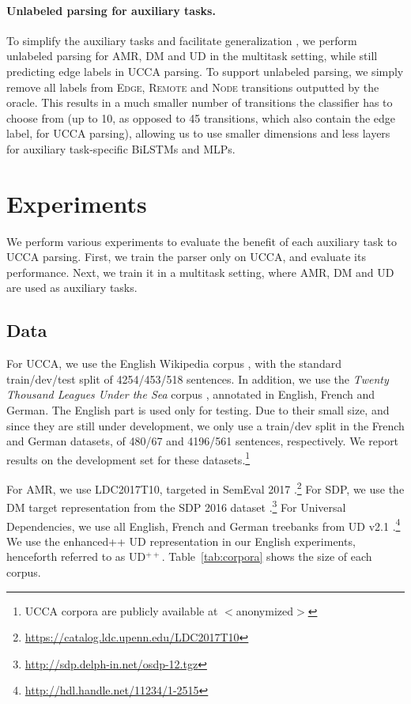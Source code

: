 \documentclass[11pt,a4paper]{article}
\begin{document}
\paragraph{Unlabeled parsing for auxiliary tasks.}

To simplify the auxiliary tasks and facilitate generalization \cite{E17-2026},
we perform unlabeled parsing for AMR, DM and UD in the multitask setting,
while still predicting edge labels in UCCA parsing.
To support unlabeled parsing, we simply remove all labels from
\textsc{Edge}, \textsc{Remote} and \textsc{Node} transitions outputted by the oracle.
This results in a much smaller number of transitions the classifier has to choose from
(up to 10, as opposed to 45 transitions, which also contain the edge label, for UCCA parsing),
allowing us to use smaller dimensions and less layers for auxiliary task-specific BiLSTMs and MLPs.



\section{Experiments}\label{sec:experiments}

We perform various experiments to evaluate the benefit of each auxiliary task to UCCA parsing.
First, we train the parser only on UCCA, and evaluate its performance.
Next, we train it in a multitask setting, where AMR, DM and UD are used as
auxiliary tasks.

\subsection{Data}\label{sec:data}

For UCCA, we use the English Wikipedia corpus \cite{abend2013universal},
with the standard train/dev/test split of 4254/453/518 sentences.
In addition, we use
the \textit{Twenty Thousand Leagues Under the Sea} corpus \cite[20K leagues;][]{sulem2015conceptual},
annotated in English, French and German.
The English part is used only for testing.
Due to their small size, and since they are still under development, we only use a train/dev split
in the French and German datasets, of 480/67 and 4196/561 sentences, respectively.
We report results on the development set for these datasets.\footnote{UCCA corpora are publicly
available at $<$anonymized$>$}

For AMR, we use LDC2017T10, targeted in SemEval 2017
\cite{may2017semeval}.\footnote{\url{https://catalog.ldc.upenn.edu/LDC2017T10}}
For SDP, we use the DM target representation from the SDP 2016 dataset
\cite{oepen2016towards}.\footnote{\url{http://sdp.delph-in.net/osdp-12.tgz}}
For Universal Dependencies, we use all English, French and German treebanks from UD v2.1
\cite{11234/1-2515}.\footnote{\url{http://hdl.handle.net/11234/1-2515}}
We use the enhanced++ UD representation \cite{SCHUSTER16.779} in our English experiments,
henceforth referred to as UD$^{++}$.
Table~\ref{tab:corpora} shows the size of each corpus.
\end{document}

